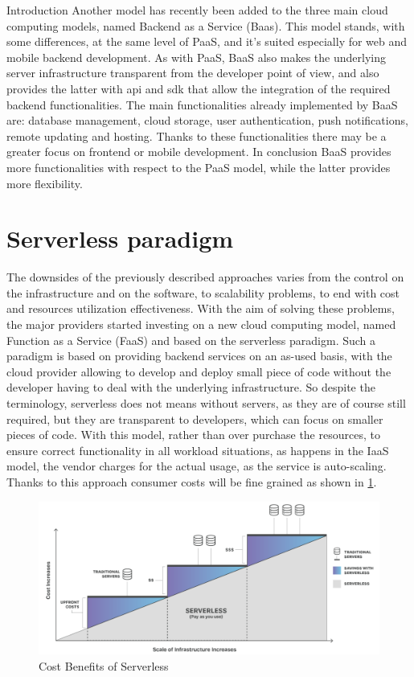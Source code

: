\begin{chapter}{Introduction}
    Another model has recently been added to the three main cloud computing models, named
    Backend as a Service (Baas). This model stands, with some differences, at the same
    level of PaaS, and it's suited especially for web and mobile backend development.
    As with PaaS, BaaS also makes the underlying server infrastructure transparent
    from the developer point of view, and also provides the latter with api and sdk
    that allow the integration of the required backend functionalities.
    The main functionalities already implemented by BaaS are: database management,
    cloud storage, user authentication, push notifications, remote updating and hosting.
    Thanks to these functionalities there may be a greater focus on frontend or mobile
    development.
    In conclusion BaaS provides more functionalities with respect to the PaaS model,
    while the latter provides more flexibility.

    \section{Serverless paradigm}
    The downsides of the previously described approaches varies from the control on the
    infrastructure and on the software, to scalability problems, to end with cost
    and resources utilization effectiveness.
    With the aim of solving these problems, the major providers started investing on
    a new cloud computing model, named Function as a Service (FaaS) and based on the
    serverless paradigm.
    Such a paradigm is based on providing backend services on an as-used basis, with
    the cloud provider allowing to develop and deploy small piece of code without
    the developer having to deal with the underlying infrastructure.
    So despite the terminology, serverless does not means without servers, as they are
    of course still required, but they are transparent to developers, which can focus
    on smaller pieces of code.
    With this model, rather than over purchase the resources, to ensure correct
    functionality in all workload situations, as happens in the IaaS model, the vendor
    charges for the actual usage, as the service is auto-scaling. Thanks to this approach
    consumer costs will be fine grained as shown in \ref{fig:serverless_benefits}.

    \begin{figure}
        \centering
        \includegraphics[width=\linewidth]{source/images/benefits-of-serverless.png}
        \caption{Cost Benefits of Serverless}
        \label{fig:serverless_benefits}
    \end{figure}


\end{chapter}
